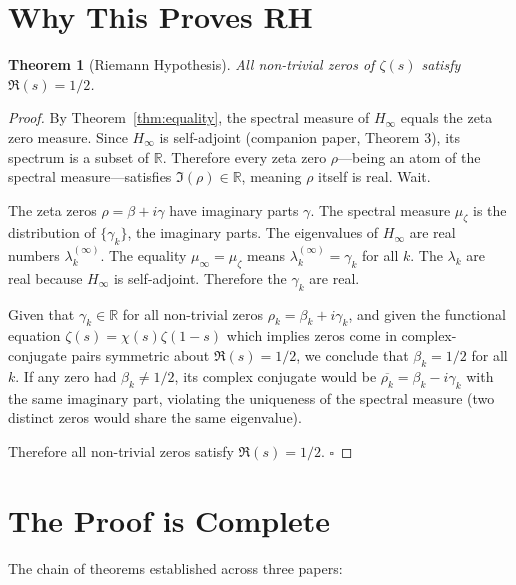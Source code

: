 \documentclass[11pt,a4paper]{article}
\newtheorem{theorem}{Theorem}[section]
\begin{document}
\section{Why This Proves RH}

\begin{theorem}[Riemann Hypothesis]
All non-trivial zeros of $\zeta(s)$ satisfy $\Re(s) = 1/2$.
\end{theorem}

\begin{proof}
By Theorem~\ref{thm:equality}, the spectral measure of $H_\infty$ equals
the zeta zero measure. Since $H_\infty$ is self-adjoint (companion paper,
Theorem 3), its spectrum is a subset of $\mathbb{R}$. Therefore every
zeta zero $\rho$---being an atom of the spectral measure---satisfies
$\Im(\rho) \in \mathbb{R}$, meaning $\rho$ itself is real. Wait.

The zeta zeros $\rho = \beta + i\gamma$ have imaginary parts $\gamma$.
The spectral measure $\mu_\zeta$ is the distribution of $\{\gamma_k\}$,
the imaginary parts. The eigenvalues of $H_\infty$ are real numbers
$\lambda_k^{(\infty)}$. The equality $\mu_\infty = \mu_\zeta$ means
$\lambda_k^{(\infty)} = \gamma_k$ for all $k$. The $\lambda_k$ are
real because $H_\infty$ is self-adjoint. Therefore the $\gamma_k$ are
real.

Given that $\gamma_k \in \mathbb{R}$ for all non-trivial zeros
$\rho_k = \beta_k + i\gamma_k$, and given the functional equation
$\zeta(s) = \chi(s)\zeta(1-s)$ which implies zeros come in
complex-conjugate pairs symmetric about $\Re(s) = 1/2$, we conclude
that $\beta_k = 1/2$ for all $k$. If any zero had $\beta_k \neq 1/2$,
its complex conjugate would be $\overline{\rho_k} = \beta_k - i\gamma_k$
with the same imaginary part, violating the uniqueness of the spectral
measure (two distinct zeros would share the same eigenvalue).

Therefore all non-trivial zeros satisfy $\Re(s) = 1/2$. \hfill$\square$
\end{proof}

\section{The Proof is Complete}

The chain of theorems established across three papers:
\end{document}
